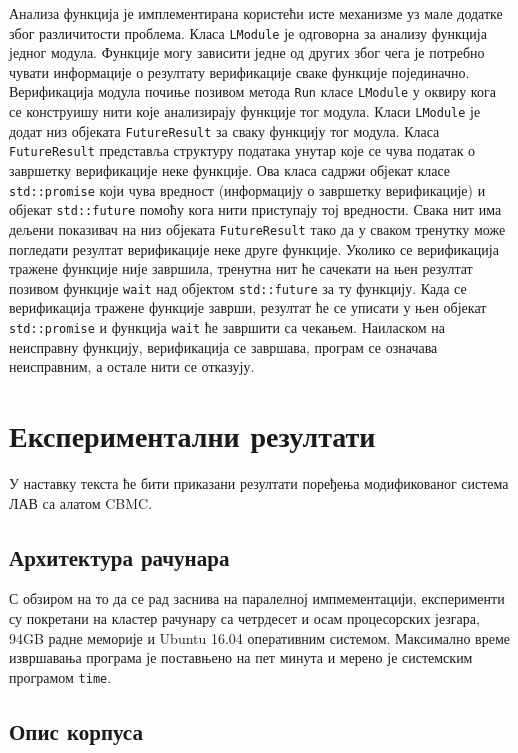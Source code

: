 \documentclass[12pt,oneside]{memoir}
\begin{document}
Анализа функција је имплементирана користећи исте механизме уз мале додатке због различитости проблема.   
 Класа \texttt{LModule} је одговорна за анализу функција једног модула. Функције могу зависити једне од других због чега је потребно чувати информације о резултату верификације сваке функције појединачно. Верификација модула почиње позивом метода \texttt{Run} класе \texttt{LModule} у оквиру кога се конструишу нити које анализирају функције тог модула. Класи \texttt{LModule} је додат низ објеката \texttt{FutureResult} за сваку функцију тог модула. Класа \texttt{FutureResult} представља структуру података унутар које се чува податак о завршетку верификације неке функције. Ова класа садржи објекат класе \texttt{std::promise}  који чува вредност (информацију о завршетку верификације) и објекат \texttt{std::future} помоћу кога нити приступају тој вредности. Свака нит има дељени показивач на низ објеката \texttt{FutureResult} тако да у сваком тренутку може погледати резултат верификације неке друге функције. Уколико се верификација тражене функције није завршила, тренутна нит ће сачекати на њен резултат позивом функције \texttt{wait} над објектом \texttt{std::future} за ту функцију. Када се верификација тражене функције заврши, резултат ће се уписати у њен објекат \texttt{std::promise} и функција \texttt{wait} ће завршити са чекањем. Наиласком на неисправну функцију, верификација се завршава, програм се означава неисправним, а остале нити се отказују. 

\chapter{Експериментални резултати}

У наставку текста ће бити приказани резултати поређења модификованог система ЛАВ са алатом CBMC. 
  \section{Архитектура рачунара}
  
  С обзиром на то да се рад заснива на паралелној импмементацији, експерименти су покретани на кластер рачунару са четрдесет и осам процесорских језгара, 94GB радне меморије и Ubuntu 16.04 оперативним системом. Максимално време извршавања програма је поставњено на пет минута и мерено је системским програмом \texttt{time}.
  
  \section{Опис корпуса}
  
\end{document}
